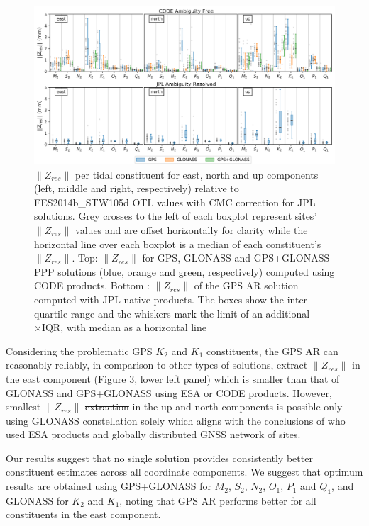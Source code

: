 \documentclass[se, manuscript]{copernicus}
\providecommand{\DIFadd}[1]{{\protect\color{blue}\uwave{#1}}} %
\providecommand{\DIFdel}[1]{{\protect\color{red}\sout{#1}}}                      %
\providecommand{\DIFaddbegin}{} %
\providecommand{\DIFaddend}{} %
\providecommand{\DIFdelbegin}{} %
\providecommand{\DIFdelend}{} %
\begin{document}
\begin{figure}[t]
\includegraphics[width=17cm]{fig03.png}
\caption{$\|Z_{res}\|$ per tidal constituent for east, north and up components (left, middle and right, respectively) relative to FES2014b\_STW105d OTL values with CMC correction for JPL solutions. Grey crosses to the left of each boxplot represent sites’ $\|Z_{res}\|$ values and are offset horizontally for clarity while the horizontal line over each boxplot is a median of each constituent’s $\|Z_{res}\|$. Top: $\|Z_{res}\|$ for GPS, GLONASS and GPS+GLONASS PPP solutions (blue, orange and green, respectively) computed using CODE products. Bottom : $\|Z_{res}\|$ of the GPS AR solution computed with JPL native products. The boxes show the inter-quartile range and the whiskers mark the limit of an additional $\times\text{IQR}$, with median as a horizontal line}
\end{figure}

Considering the problematic GPS $K_2$ and $K_1$ constituents, the GPS AR can reasonably reliably, in comparison to other types of solutions, extract $\|Z_{res}\|$ in the east component (Figure 3, lower left panel) which is smaller than that of GLONASS and GPS+GLONASS using ESA or CODE products. However, smallest $\|Z_{res}\|$ \DIFdelbegin \DIFdel{extraction }\DIFdelend in the up and north components is possible only using \DIFaddbegin \DIFadd{the }\DIFaddend GLONASS constellation solely which aligns with the conclusions of \cite{abbaszadeh_benefits_2020} who used ESA products and globally distributed GNSS network of sites.

Our results suggest that no single solution provides consistently better constituent estimates across all coordinate components. We suggest that optimum results are obtained using GPS+GLONASS for $M_2$, $S_2$, $N_2$, $O_1$, $P_1$ and $Q_1$, and GLONASS for $K_2$ and $K_1$, noting that GPS AR performs better for all constituents in the east component.
\end{document}
